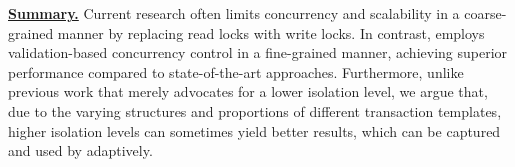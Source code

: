 \noindent \textbf{\underline{Summary.}} 
Current research often limits concurrency and scalability in a coarse-grained manner by replacing read locks with write locks. In contrast, \sysname employs validation-based concurrency control in a fine-grained manner, achieving superior performance compared to state-of-the-art approaches. Furthermore, unlike previous work that merely advocates for a lower isolation level, we argue that, due to the varying structures and proportions of different transaction templates, higher isolation levels can sometimes yield better results, which can be captured and used by \sysname adaptively.









